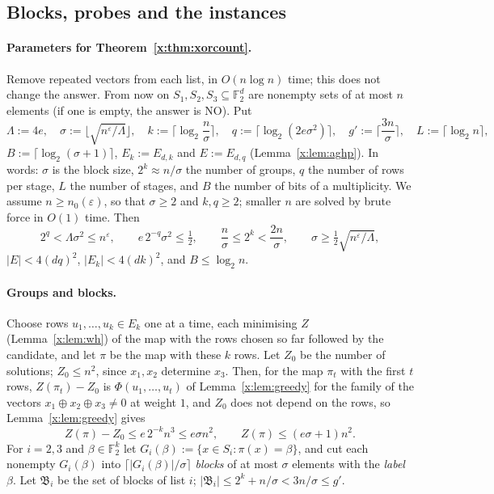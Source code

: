 \documentclass[11pt]{article}
\theoremstyle{definition}
\theoremstyle{remark}
\newcommand{\F}{\mathbb{F}_2}
\begin{document}
\subsection{Blocks, probes and the instances}\label{x:sec:xorprobes}

\paragraph{Parameters for Theorem~\ref{x:thm:xorcount}.} Remove repeated vectors from each list, in $O(n\log n)$ time; this does not change the answer. From now on $S_1,S_2,S_3\subseteq\F^d$ are nonempty sets of at most $n$ elements (if one is empty, the answer is NO). Put
\[
\Lambda:=4e,\quad\sigma:=\Big\lfloor\sqrt{n^\varepsilon/\Lambda}\Big\rfloor,\quad k:=\Big\lceil\log_2\frac n\sigma\Big\rceil,\quad q:=\lceil\log_2(2e\sigma^2)\rceil,\quad g':=\Big\lceil\frac{3n}\sigma\Big\rceil,\quad L:=\lceil\log_2n\rceil,
\]
$B:=\lceil\log_2(\sigma+1)\rceil$, $E_k:=E_{d,k}$ and $E:=E_{d,q}$ (Lemma~\ref{x:lem:aghp}). In words: $\sigma$ is the block size, $2^k\approx n/\sigma$ the number of groups, $q$ the number of rows per stage, $L$ the number of stages, and $B$ the number of bits of a multiplicity. We assume $n\ge n_0(\varepsilon)$, so that $\sigma\ge2$ and $k,q\ge2$; smaller $n$ are solved by brute force in $O(1)$ time. Then
\begin{equation}\label{x:eq:params}
2^q<\Lambda\sigma^2\le n^\varepsilon,\qquad e\,2^{-q}\sigma^2\le\tfrac12,\qquad \frac n\sigma\le2^k<\frac{2n}\sigma,\qquad\sigma\ge\tfrac12\sqrt{n^\varepsilon/\Lambda},
\end{equation}
$|E|<4(dq)^2$, $|E_k|<4(dk)^2$, and $B\le\log_2n$.

\paragraph{Groups and blocks.} Choose rows $u_1,\dots,u_k\in E_k$ one at a time, each minimising $Z$ (Lemma~\ref{x:lem:wh}) of the map with the rows chosen so far followed by the candidate, and let $\pi$ be the map with these $k$ rows. Let $Z_0$ be the number of solutions; $Z_0\le n^2$, since $x_1,x_2$ determine $x_3$. Then, for the map $\pi_t$ with the first $t$ rows, $Z(\pi_t)-Z_0$ is $\Phi(u_1,\dots,u_t)$ of Lemma~\ref{x:lem:greedy} for the family of the vectors $x_1\oplus x_2\oplus x_3\ne0$ at weight $1$, and $Z_0$ does not depend on the rows, so Lemma~\ref{x:lem:greedy} gives
\begin{equation}\label{x:eq:zpi}
Z(\pi)-Z_0\le e\,2^{-k}n^3\le e\sigma n^2,\qquad Z(\pi)\le(e\sigma+1)n^2 .
\end{equation}
For $i=2,3$ and $\beta\in\F^k$ let $G_i(\beta):=\{x\in S_i:\pi(x)=\beta\}$, and cut each nonempty $G_i(\beta)$ into $\lceil|G_i(\beta)|/\sigma\rceil$ \emph{blocks} of at most $\sigma$ elements with the \emph{label} $\beta$. Let $\mathfrak B_i$ be the set of blocks of list $i$; $|\mathfrak B_i|\le2^k+n/\sigma<3n/\sigma\le g'$.
\end{document}
